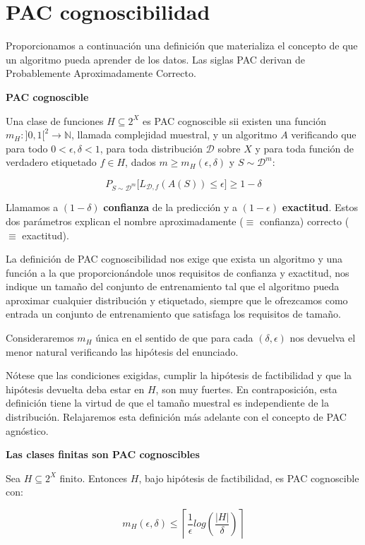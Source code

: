 \section{PAC cognoscibilidad}
Proporcionamos a continuación una definición que materializa el concepto de que un algoritmo pueda aprender de los datos. Las
siglas PAC derivan de Probablemente Aproximadamente Correcto.

\begin{definition*} \textbf{PAC cognoscible}

Una clase de funciones $H \subseteq 2^X$ es PAC cognoscible sii existen una función 
$m_{H} : ]0,1[^2\rightarrow \mathbb{N}$, llamada complejidad muestral, y un algoritmo $A$ verificando que para todo
$0 < \epsilon, \delta < 1$, para toda distribución $\mathcal{D}$ sobre $X$ y para toda función de 
verdadero etiquetado $f\in H$, dados $m \ge m_H(\epsilon, \delta)$ y $S\sim \mathcal{D}^m$:

\[P_{S\sim \mathcal{D}^m} \bigg[L_{\mathcal{D},f}(A(S)) \le \epsilon \bigg] \ge 1-\delta\]
\end{definition*}

Llamamos a $(1-\delta)$ \textbf{confianza} de la predicción y a $(1-\epsilon)$ \textbf{exactitud}. Estos dos parámetros 
explican el nombre aproximadamente ($\equiv$ confianza) correcto ($\equiv$ exactitud).

La definición de PAC cognoscibilidad nos exige que exista un algoritmo y una función a la que proporcionándole unos requisitos
de confianza y exactitud, nos indique un tamaño del conjunto de entrenamiento tal que el algoritmo pueda aproximar cualquier
distribución y etiquetado, siempre que le ofrezcamos como entrada un conjunto de entrenamiento que satisfaga los 
requisitos de tamaño.

Consideraremos $m_{H}$ única en el sentido de que para cada $(\delta, \epsilon)$ nos devuelva el menor natural
verificando las hipótesis del enunciado.

Nótese que las condiciones exigidas, cumplir la hipótesis de factibilidad y que la hipótesis devuelta deba estar en $H$, 
son muy fuertes. En contraposición, esta definición tiene la virtud de que el tamaño muestral es independiente de la 
distribución. Relajaremos esta definición más adelante con el concepto de PAC agnóstico.

\begin{theorem*} \textbf{Las clases finitas son PAC cognoscibles}

Sea $H \subseteq 2^{X}$ finito. Entonces $H$, bajo hipótesis de factibilidad, es PAC cognoscible con:

\[m_H(\epsilon, \delta) \le \left\lceil \frac{1}{\epsilon}log \left(\frac{|H|}{\delta} \right) \right\rceil\]
\end{theorem*}

